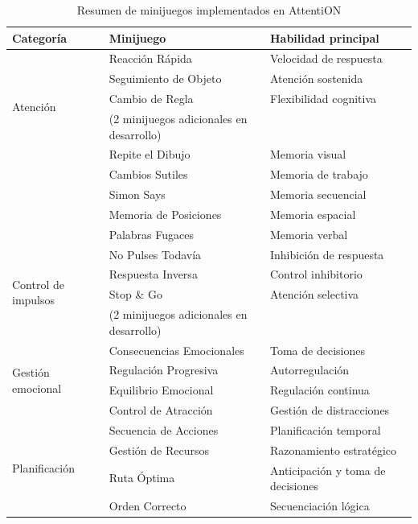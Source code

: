 \documentclass[12pt, a4paper]{report}
\begin{document}
\begin{table}[H]
\centering
\caption{Resumen de minijuegos implementados en AttentiON}
\label{tab:minijuegos}
\renewcommand{\arraystretch}{1.3}
\begin{tabularx}{\textwidth}{|l|X|l|}
\hline
\textbf{Categoría} & \textbf{Minijuego} & \textbf{Habilidad principal} \\
\hline
\multirow{5}{*}{Atención}
  & Reacción Rápida          & Velocidad de respuesta \\
  & Seguimiento de Objeto    & Atención sostenida \\
  & Cambio de Regla          & Flexibilidad cognitiva \\
  & (2 minijuegos adicionales en desarrollo) & \\
\hline
\multirow{5}{*}{Memoria}
  & Repite el Dibujo          & Memoria visual \\
  & Cambios Sutiles           & Memoria de trabajo \\
  & Simon Says                & Memoria secuencial \\
  & Memoria de Posiciones     & Memoria espacial \\
  & Palabras Fugaces          & Memoria verbal \\
\hline
\multirow{4}{*}{Control de impulsos}
  & No Pulses Todavía         & Inhibición de respuesta \\
  & Respuesta Inversa         & Control inhibitorio \\
  & Stop \& Go                & Atención selectiva \\
  & (2 minijuegos adicionales en desarrollo) & \\
\hline
\multirow{4}{*}{Gestión emocional}
  & Consecuencias Emocionales & Toma de decisiones \\
  & Regulación Progresiva     & Autorregulación \\
  & Equilibrio Emocional      & Regulación continua \\
  & Control de Atracción      & Gestión de distracciones \\
\hline
\multirow{4}{*}{Planificación}
  & Secuencia de Acciones     & Planificación temporal \\
  & Gestión de Recursos       & Razonamiento estratégico \\
  & Ruta Óptima               & Anticipación y toma de decisiones \\
  & Orden Correcto            & Secuenciación lógica \\
\hline
\end{tabularx}
\end{table}
\end{document}
